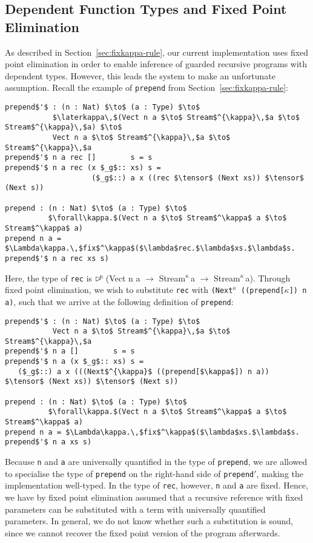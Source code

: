 \subsection{Dependent Function Types and Fixed Point Elimination}
\label{sec:depend-funct-types}
As described in Section~\ref{sec:fixkappa-rule}, our current implementation uses
fixed point elimination in order to enable inference of guarded recursive
programs with dependent types. However, this leads the system to make an
unfortunate assumption. Recall the example of \texttt{prepend} from
Section~\ref{sec:fixkappa-rule}:
\begin{lstlisting}[mathescape, title=\ttBlock]
prepend$'$ : (n : Nat) $\to$ (a : Type) $\to$
           $\laterkappa\,$(Vect n a $\to$ Stream$^{\kappa}\,$a $\to$ Stream$^{\kappa}\,$a) $\to$ 
           Vect n a $\to$ Stream$^{\kappa}\,$a $\to$ Stream$^{\kappa}\,$a
prepend$'$ n a rec []        s = s 
prepend$'$ n a rec (x $_g$:: xs) s = 
                    ($_g$::) a x ((rec $\tensor$ (Next xs)) $\tensor$ (Next s))

prepend : (n : Nat) $\to$ (a : Type) $\to$ 
          $\forall\kappa.$(Vect n a $\to$ Stream$^\kappa$ a $\to$ Stream$^\kappa$ a)
prepend n a = $\Lambda\kappa.\,$fix$^\kappa$($\lambda$rec.$\lambda$xs.$\lambda$s. prepend$'$ n a rec xs s)
\end{lstlisting}
Here, the type of \texttt{rec} is {$\rhd^{\!\!\kappa}\,$(Vect n a $\to$
  Stream$^{\kappa}\,$a $\to$ Stream$^{\kappa}\,$a)}. Through fixed point
elimination, we wish to substitute \texttt{rec} with \texttt{{(Next$^{\kappa}$
    ((prepend[$\kappa$]) n a)}}, such that we arrive at the following definition
of \texttt{prepend}:
\begin{lstlisting}[mathescape, title=\ttBlock]
prepend$'$ : (n : Nat) $\to$ (a : Type) $\to$
           Vect n a $\to$ Stream$^{\kappa}\,$a $\to$ Stream$^{\kappa}\,$a
prepend$'$ n a []        s = s 
prepend$'$ n a (x $_g$:: xs) s = 
   ($_g$::) a x (((Next$^{\kappa}$ ((prepend[$\kappa$]) n a)) $\tensor$ (Next xs)) $\tensor$ (Next s))

prepend : (n : Nat) $\to$ (a : Type) $\to$ 
          $\forall\kappa.$(Vect n a $\to$ Stream$^\kappa$ a $\to$ Stream$^\kappa$ a)
prepend n a = $\Lambda\kappa.\,$fix$^\kappa$($\lambda$xs.$\lambda$s. prepend$'$ n a xs s)
\end{lstlisting}
Because \texttt{n} and \texttt{a} are universally quantified in the type of
\texttt{prepend}, we are allowed to specialise the type of \texttt{prepend} on
the right-hand side of \texttt{prepend$'$}, making the implementation
well-typed. In the type of \texttt{rec}, however, \texttt{n} and \texttt{a} are
fixed. Hence, we have by fixed point elimination assumed that a recursive
reference with fixed parameters can be substituted with a term with universally
quantified parameters. In general, we do not know whether such a substitution is sound, since we
cannot recover the fixed point version of the program afterwards.

